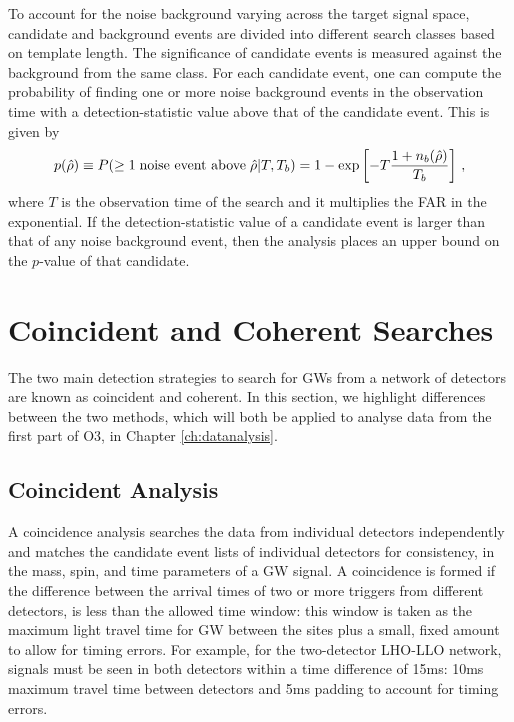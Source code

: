 \documentclass[binding=0.6cm, LaM]{sapthesis}
\begin{document}
	To account for the noise background varying across the target signal space, 
	candidate and background events are divided into different search classes based on template length. 
	The significance of candidate events is measured against the background from the same class. 
	For each candidate event, one can compute the probability of finding one or more 
	noise background events in the observation time with a detection-statistic value above that of the candidate event.  This is given by 
        \begin{equation}
          p(\hat \rho) \equiv P(\geq 1 \hspace*{0.1cm}\text{noise event above}\hspace*{0.1cm} \hat \rho|T,T_b) = 1 - \exp\left[-T{{1+n_b(\hat \rho)} \over{T_b}}\right]\,,
        \end{equation}
	where $T$ is the observation time of the search and it multiplies the FAR in the exponential.
	If the detection-statistic value of a candidate event is larger 
	than that of any noise background event, 
	then the analysis places an upper bound on the $p$-value of that candidate. 
	

\section{Coincident and Coherent Searches}
	The two main detection strategies to search for GWs 	
	from a network of detectors are known as coincident and coherent.
	In this section, we highlight differences between the two methods, 
	which will both be applied to analyse data from the first part of O3, in Chapter \ref{ch:datanalysis}.


\subsection{Coincident Analysis}
\label{subsec:coincident}
 	A coincidence analysis searches the data from individual detectors independently
        and matches the candidate event lists of individual detectors for consistency,
        in the mass, spin, and time parameters of a GW signal.
	A coincidence is formed if the difference between the arrival times of two or more triggers from different detectors, 
	is less than the allowed time window:
	this window is taken as the maximum light travel time for GW between the sites plus a small, 
	fixed amount to allow for timing errors. 
	For example, for the two-detector LHO-LLO network, signals must be seen in both detectors within a time difference of 15ms: 
	10ms maximum travel time between detectors and 5ms padding to account for timing errors.
\end{document}
